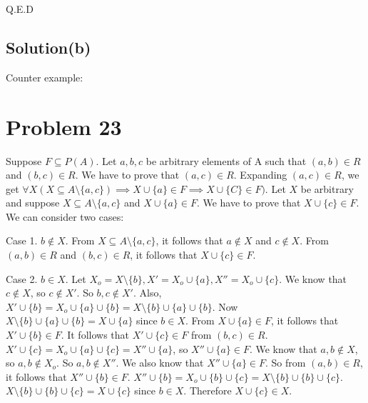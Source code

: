 \documentclass{article}
\begin{document}
Q.E.D

\subsection{Solution(b)}

Counter example: 



\section{Problem 23}
Suppose $F \subseteq P(A)$. Let $a,b,c$ be arbitrary elements of A
such that $(a,b) \in R$ and $(b,c) \in R$. We have to prove that
$(a,c) \in R$. Expanding $(a,c) \in R$, we get $\forall X(X \subseteq
A \setminus \{a,c\}) \implies X \cup \{a\} \in F \implies X \cup \{C\}
\in F)$. Let $X$ be arbitrary and suppose $X \subseteq A \setminus
\{a,c\}$ and $X \cup \{a\} \in F$. We have to prove that $X \cup \{c\}
\in F$. We can consider two cases:

Case 1. $b \notin X$. From $X \subseteq A \setminus \{a,c\}$, it
follows that $a \notin X$ and $c \notin X$. From $(a,b) \in R$ and
$(b,c) \in R$, it follows that $X \cup \{c\} \in F$.

Case 2. $b \in X$. Let $X_o = X \setminus \{b\}, X' = X_o \cup \{a\},
X'' = X_o \cup \{c\}$. We know that $c \notin X$, so $c \notin X'$. So
$b,c \notin X'$. Also, $X' \cup \{b\} = X_o \cup \{a\} \cup \{b\} = X
\setminus \{b\} \cup \{a\} \cup \{b\}$. Now $X \setminus \{b\} \cup
\{a\} \cup \{b\} = X \cup \{a\} $ since $b \in X$. From $X \cup \{a\}
\in F$, it follows that $X' \cup \{b\} \in F$. It follows that $X'
\cup \{c\} \in F$ from $(b,c) \in R$. $X' \cup \{c\} = X_o \cup \{a\}
\cup \{c\} = X'' \cup \{a\}$, so $X'' \cup \{a\} \in F$. We know that
$a,b \notin X$, so $a,b \notin X_o$. So $a,b \notin X''$. We also know
that $X'' \cup \{a\} \in F$. So from $(a,b) \in R$, it follows that
$X'' \cup \{b\} \in F$. $X'' \cup \{b\} = X_o \cup \{b\} \cup \{c\} =
X \setminus \{b\} \cup \{b\} \cup \{c\}$. $X \setminus \{b\} \cup
\{b\} \cup \{c\} = X \cup \{c\}$ since $b \in X$. Therefore $X \cup
\{c\} \in X$.
\end{document}
